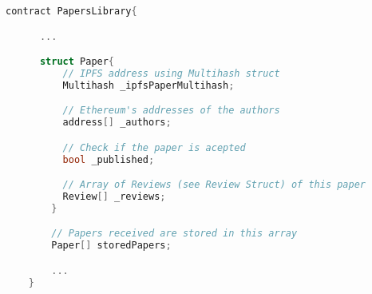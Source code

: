 \begin{minipage}{\linewidth}
\begin{lstlisting}[language=C++,commentstyle=\color{olive}\ttfamily,frame=single,caption=Struct used for stroring papers in the
  first prototype,label=arstruct,captionpos=b]
  contract PapersLibrary{

      ...

      struct Paper{
          // IPFS address using Multihash struct
          Multihash _ipfsPaperMultihash;

          // Ethereum's addresses of the authors
          address[] _authors;

          // Check if the paper is acepted
          bool _published;

          // Array of Reviews (see Review Struct) of this paper
          Review[] _reviews; 
        }

        // Papers received are stored in this array
        Paper[] storedPapers;

        ...
    }
  \end{lstlisting}
  \end{minipage}